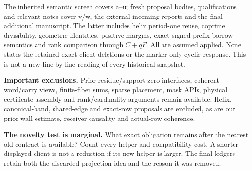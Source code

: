 The inherited semantic screen covers a--u; fresh proposal bodies, qualifications and relevant notes cover v/w, the external incoming reports and the final additional manuscript. The latter includes helix period-one reuse, coprime divisibility, geometric identities, positive margins, exact signed-prefix borrow semantics and rank comparison through \(C+qF\). All are assumed applied. None states the retained exact client deletions or the marker-only cyclic response. This is not a new line-by-line reading of every historical snapshot.

\textbf{Important exclusions.} Prior residue/support-zero interfaces, coherent word/carry views, finite-fiber sums, sparse placement, mask APIs, physical certificate assembly and rank/cardinality arguments remain available. Helix, canonical-band, shared-edge and exact-row proposals are excluded, as are our prior wall estimate, receiver causality and actual-row coherence.

\textbf{The novelty test is marginal.} What exact obligation remains after the nearest old contract is available? Count every helper and compatibility cost. A shorter displayed client is not a reduction if its new helper is larger. The final ledgers retain both the discarded projection idea and the reason it was removed.
